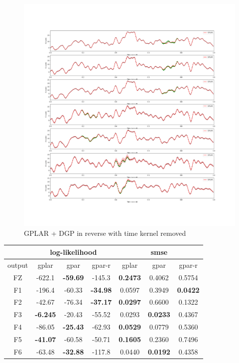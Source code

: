 \documentclass{article}
\begin{document}
\begin{figure}[H]
\centering
\includegraphics[width=.8\linewidth]{345-eeg-remove-x.png}
\caption{GPLAR + DGP in reverse with time kernel removed}
\end{figure}

\begin{center}
\begin{tabular}{|c|c|c|c|c|c|c|}
	\hline
	 & \multicolumn{3}{c|}{log-likelihood} & \multicolumn{3}{c|}{smse}\\
	\hline
	output & gplar & gpar & gpar-r & gplar & gpar & gpar-r\\
	\hline
	FZ & -622.1 & \textbf{-59.69} & -145.3 & \textbf{0.2473} & 0.4062 & 0.5754\\
	F1 & -196.4 & -60.33 & \textbf{-34.98} & 0.0597 & 0.3949 & \textbf{0.0422}\\
	F2 & -42.67 & -76.34 & \textbf{-37.17} & \textbf{0.0297} & 0.6600 & 0.1322\\
	F3 & \textbf{-6.245} & -20.43 & -55.52 & 0.0293 & \textbf{0.0233} & 0.4367\\
	F4 & -86.05 & \textbf{-25.43} & -62.93 & \textbf{0.0529} & 0.0779 & 0.5360\\
	F5 & \textbf{-41.07} & -60.58 & -50.71 & \textbf{0.1605} & 0.2360 & 0.7496\\
	F6 & -63.48 & \textbf{-32.88} & -117.8 & 0.0440 & \textbf{0.0192} & 0.4358\\
	\hline
\end{tabular}
\end{center}
\end{document}
